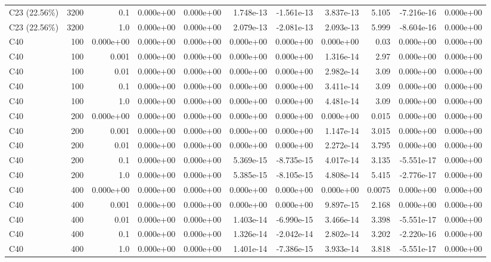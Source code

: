 \begin{table}[!htb]
{\begin{tabular}{@{}lrrrrrrrrrr@{}}
C23 (22.56\%) & 3200 & 0.1 & 0.000e+00 & 0.000e+00 & 1.748e-13 & -1.561e-13 & 3.837e-13 & 5.105 & -7.216e-16 & 0.000e+00 \\
C23 (22.56\%) & 3200 & 1.0 & 0.000e+00 & 0.000e+00 & 2.079e-13 & -2.081e-13 & 2.093e-13 & 5.999 & -8.604e-16 & 0.000e+00 \\
C40 & 100 & 0.000e+00 & 0.000e+00 & 0.000e+00 & 0.000e+00 & 0.000e+00 & 0.000e+00 & 0.03 & 0.000e+00 & 0.000e+00 \\
C40 & 100 & 0.001 & 0.000e+00 & 0.000e+00 & 0.000e+00 & 0.000e+00 & 1.316e-14 & 2.97 & 0.000e+00 & 0.000e+00 \\
C40 & 100 & 0.01 & 0.000e+00 & 0.000e+00 & 0.000e+00 & 0.000e+00 & 2.982e-14 & 3.09 & 0.000e+00 & 0.000e+00 \\
C40 & 100 & 0.1 & 0.000e+00 & 0.000e+00 & 0.000e+00 & 0.000e+00 & 3.411e-14 & 3.09 & 0.000e+00 & 0.000e+00 \\
C40 & 100 & 1.0 & 0.000e+00 & 0.000e+00 & 0.000e+00 & 0.000e+00 & 4.481e-14 & 3.09 & 0.000e+00 & 0.000e+00 \\
C40 & 200 & 0.000e+00 & 0.000e+00 & 0.000e+00 & 0.000e+00 & 0.000e+00 & 0.000e+00 & 0.015 & 0.000e+00 & 0.000e+00 \\
C40 & 200 & 0.001 & 0.000e+00 & 0.000e+00 & 0.000e+00 & 0.000e+00 & 1.147e-14 & 3.015 & 0.000e+00 & 0.000e+00 \\
C40 & 200 & 0.01 & 0.000e+00 & 0.000e+00 & 0.000e+00 & 0.000e+00 & 2.272e-14 & 3.795 & 0.000e+00 & 0.000e+00 \\
C40 & 200 & 0.1 & 0.000e+00 & 0.000e+00 & 5.369e-15 & -8.735e-15 & 4.017e-14 & 3.135 & -5.551e-17 & 0.000e+00 \\
C40 & 200 & 1.0 & 0.000e+00 & 0.000e+00 & 5.385e-15 & -8.105e-15 & 4.808e-14 & 5.415 & -2.776e-17 & 0.000e+00 \\
C40 & 400 & 0.000e+00 & 0.000e+00 & 0.000e+00 & 0.000e+00 & 0.000e+00 & 0.000e+00 & 0.0075 & 0.000e+00 & 0.000e+00 \\
C40 & 400 & 0.001 & 0.000e+00 & 0.000e+00 & 0.000e+00 & 0.000e+00 & 9.897e-15 & 2.168 & 0.000e+00 & 0.000e+00 \\
C40 & 400 & 0.01 & 0.000e+00 & 0.000e+00 & 1.403e-14 & -6.990e-15 & 3.466e-14 & 3.398 & -5.551e-17 & 0.000e+00 \\
C40 & 400 & 0.1 & 0.000e+00 & 0.000e+00 & 1.326e-14 & -2.042e-14 & 2.802e-14 & 3.202 & -2.220e-16 & 0.000e+00 \\
C40 & 400 & 1.0 & 0.000e+00 & 0.000e+00 & 1.401e-14 & -7.386e-15 & 3.933e-14 & 3.818 & -5.551e-17 & 0.000e+00 \\

\end{tabular}}
\end{table}
